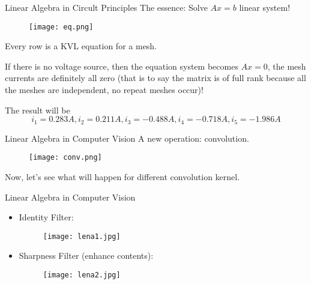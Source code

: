\documentclass{beamer}
\begin{document}
\begin{frame}{Linear Algebra in Circult Principles}
The essence: Solve $Ax=b$ linear system!
\begin{figure}
    \centering
    \texttt{[image: eq.png]}
\end{figure}

Every row is a KVL equation for a mesh.

\vspace{3pt}
If there is no voltage source, then the equation system becomes $Ax=0$, the mesh currents are definitely all zero (that is to say the matrix is of full rank because all the meshes are independent, no repeat meshes occur)!

\vspace{3pt}
The result will be
\begin{equation*}
    i_1=0.283A,i_2=0.211A,i_3=-0.488A,i_4=-0.718A,i_5=-1.986A
\end{equation*}

\end{frame}

\begin{frame}{Linear Algebra in Computer Vision}
A new operation: convolution.

\begin{figure}
    \centering
    \texttt{[image: conv.png]}
\end{figure}

Now, let's see what will happen for different convolution kernel.
\end{frame}

\begin{frame}{Linear Algebra in Computer Vision}
    \begin{itemize}
        \item Identity Filter:
        \begin{figure}
            \centering
            \texttt{[image: lena1.jpg]}
        \end{figure}
        \item Sharpness Filter (enhance contents):
        \begin{figure}
            \centering
            \texttt{[image: lena2.jpg]}
        \end{figure}
    \end{itemize}
\end{frame}
\end{document}
